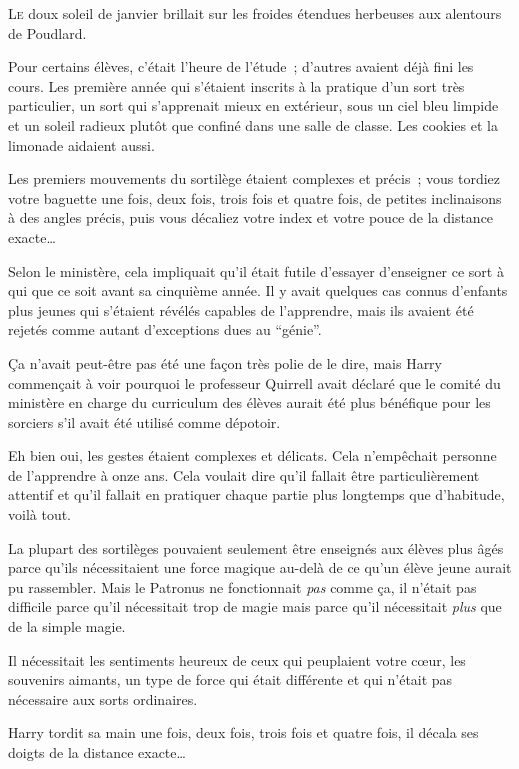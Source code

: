 
\lettrine{L}{e} doux soleil de janvier brillait sur les froides étendues herbeuses aux alentours de Poudlard.

Pour certains élèves, c'était l'heure de l'étude~; d'autres avaient déjà fini les cours.
Les première année qui s'étaient inscrits à la pratique d'un sort très particulier, un sort qui s'apprenait mieux en extérieur, sous un ciel bleu limpide et un soleil radieux plutôt que confiné dans une salle de classe.
Les cookies et la limonade aidaient aussi.

Les premiers mouvements du sortilège étaient complexes et précis~; vous tordiez votre baguette une fois, deux fois, trois fois et quatre fois, de petites inclinaisons à des angles précis, puis vous décaliez votre index et votre pouce de la distance exacte…

Selon le ministère, cela impliquait qu'il était futile d'essayer d'enseigner ce sort à qui que ce soit avant sa cinquième année.
Il y avait quelques cas connus d'enfants plus jeunes qui s'étaient révélés capables de l'apprendre, mais ils avaient été rejetés comme autant d'exceptions dues au “génie”.

Ça n'avait peut-être pas été une façon très polie de le dire, mais Harry commençait à voir pourquoi le professeur Quirrell avait déclaré que le comité du ministère en charge du curriculum des élèves aurait été plus bénéfique pour les sorciers s'il avait été utilisé comme dépotoir.

Eh bien oui, les gestes étaient complexes et délicats.
Cela n'empêchait personne de l'apprendre à onze ans.
Cela voulait dire qu'il fallait être particulièrement attentif et qu'il fallait en pratiquer chaque partie plus longtemps que d'habitude, voilà tout.

La plupart des sortilèges pouvaient seulement être enseignés aux élèves plus âgés parce qu'ils nécessitaient une force magique au-delà de ce qu'un élève jeune aurait pu rassembler.
Mais le Patronus ne fonctionnait \emph{pas} comme ça, il n'était pas difficile parce qu'il nécessitait trop de magie mais parce qu'il nécessitait \emph{plus} que de la simple magie.

Il nécessitait les sentiments heureux de ceux qui peuplaient votre cœur, les souvenirs aimants, un type de force qui était différente et qui n'était pas nécessaire aux sorts ordinaires.

Harry tordit sa main une fois, deux fois, trois fois et quatre fois, il décala ses doigts de la distance exacte…

